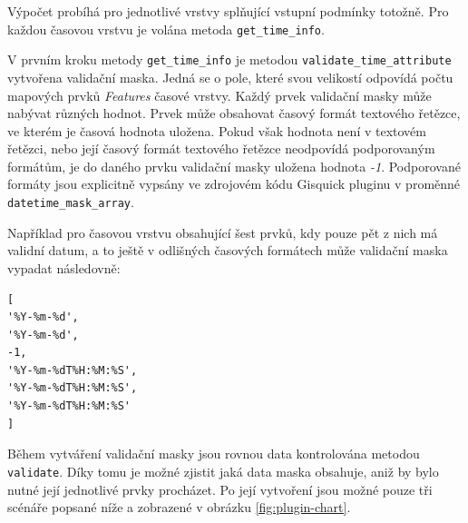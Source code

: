 Výpočet probíhá pro jednotlivé vrstvy splňující vstupní podmínky
totožně. Pro každou časovou vrstvu je volána metoda \verb|get_time_info|.

V prvním kroku metody \verb|get_time_info| je metodou
\verb|validate_time_attribute| vytvořena validační maska. Jedná se o pole,
které svou velikostí odpovídá počtu mapových prvků \textit{Features}
časové vrstvy. Každý prvek validační masky může nabývat různých
hodnot. Prvek může obsahovat časový formát textového řetězce, ve
kterém je časová hodnota uložena. Pokud však hodnota není v textovém
řetězci, nebo její časový formát textového řetězce neodpovídá
podporovaným formátům, je do daného prvku validační masky uložena
hodnota \textit{-1}. Podporované formáty jsou explicitně vypsány ve
zdrojovém kódu Gisquick pluginu v proměnné \verb|datetime_mask_array|.

Například pro časovou vrstvu obsahující šest prvků, kdy pouze pět
z nich má validní datum, a to ještě v odlišných časových formátech
může validační maska vypadat následovně:

\begin{verbatim}
[
'%Y-%m-%d',
'%Y-%m-%d',
-1,
'%Y-%m-%dT%H:%M:%S',
'%Y-%m-%dT%H:%M:%S',
'%Y-%m-%dT%H:%M:%S'
]
\end{verbatim}

Během vytváření validační masky jsou rovnou data kontrolována metodou
\verb|validate|. Díky tomu je možné zjistit jaká data maska obsahuje,
aniž by bylo nutné její jednotlivé prvky procházet. Po její vytvoření
jsou možné pouze tři scénáře popsané níže a zobrazené v obrázku
\ref{fig:plugin-chart}.


